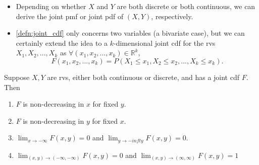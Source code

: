 \documentclass[notoc,notitlepage]{tufte-book}
\begin{document}
\begin{note}
  \begin{itemize}
    \item Depending on whether $X$ and $Y$ are both discrete or both continuous, we can derive the joint pmf or joint pdf of $(X, Y)$, respectively.
    \item \cref{defn:joint_cdf} only concerns two variables (a bivariate case), but we can certainly extend the idea to a $k$-dimensional joint cdf for the rvs $X_1, X_2, ..., X_k$ as $\forall (x_1, x_2, ..., x_k) \in \mathbb{R}^k$,
    \begin{equation*}
      F(x_1, x_2, ..., x_k) = P(X_1 \leq x_1, X_2 \leq x_2, ..., X_k \leq x_k).
    \end{equation*}
  \end{itemize}
\end{note}

\begin{propo}
\label{propo:properties_of_joint_cdf}
  Suppose $X, Y$ are rvs, either both continuous or discrete, and has a joint cdf $F$. Then
  \begin{enumerate}
    \item $F$ is non-decreasing in $x$ for fixed $y$.
    \item $F$ is non-decreasing in $y$ for fixed $x$.
    \item $\lim_{x \to - \infty} F(x, y) = 0$ and $\lim_{y \to -infty} F(x, y) = 0$.
    \item $\lim_{(x, y) \to (-\infty, -\infty)} F(x, y) = 0$ and $\lim_{(x, y) \to (\infty, \infty)} F(x, y) = 1$
  \end{enumerate}
\end{propo}
\end{document}
